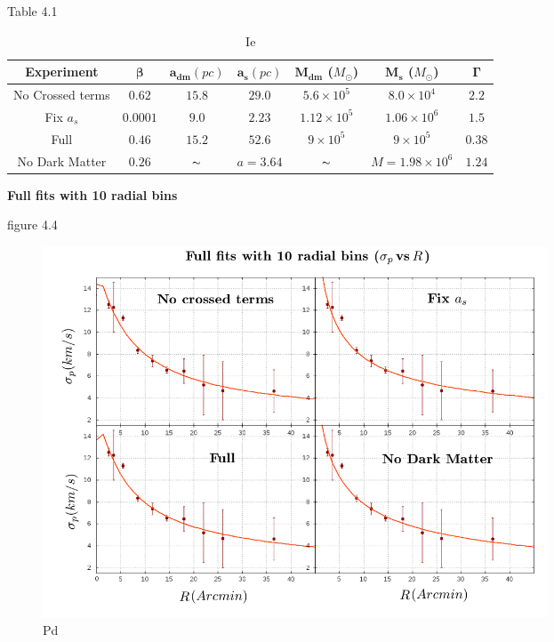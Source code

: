 Table 4.1

\begin{table}[H]
\begin{center}
\begin{tabular}{| c | c | c | c | c | c | c| }
    \hline
    \textbf{Experiment} & $\mathbf{\beta}$ & $\mathbf{a_{dm}} (pc)$ & $\mathbf{a_{s}} (pc)$ & $\mathbf{M_{dm}}$ ($M_{\odot}$) & $\mathbf{M_{s}}$ ($M_{\odot}$) & $\mathbf{\Gamma}$\\ \hline
	No Crossed terms & $0.62$ &	$15.8$ &	$29.0$ &	$5.6 \times 10^{5}$ &	$8.0 \times 10^{4}$ &	$2.2$\\ \hline
	Fix $a_s$ &	$0.0001$ &	$9.0$ &	$2.23$ &	$1.12 \times 10^{5}$ &	$1.06 \times 10 ^{6}$ &	$1.5$\\ \hline
	Full &	$0.46$ &	$15.2$ &	$52.6$ &	$9 \times 10^{5}$ &	$9 \times 10^{5}$ &	$0.38$\\ \hline
	No Dark Matter &	$0.26$ & $\thicksim$	& $ a = 3.64$  & $\thicksim$ & $  M = 1.98 \times 10^{6}$ & 	$1.24$\\
    \hline
  \end{tabular} 
\caption[It]{Ie}
\end{center}
  
\end{table}

\textbf{Full fits with 10 radial bins}

figure 4.4

\begin{figure}[H]
\centering
\includegraphics[width=15cm]{images/all_params_refinado_10.png}
\caption[Pg]{Pd}
\end{figure}

